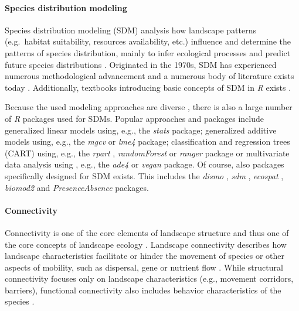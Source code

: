 \documentclass[smallextended]{svjour3}       %
\begin{document}
\hypertarget{sec:SDM}{%
\paragraph{Species distribution modeling}\label{sec:SDM}}

Species distribution modeling (SDM) analysis how landscape patterns (e.g.~habitat suitability, resources availability, etc.) influence and determine the patterns of species distribution, mainly to infer ecological processes and predict future species distributions \cite{Wiersma2011}.
Originated in the 1970s, SDM has experienced numerous methodological advancement and a numerous body of literature exists today \cite{Zimmermann2010}.
Additionally, textbooks introducing basic concepts of SDM in \emph{R} exists \cite{Guisan2017,Fletcher2019}.

Because the used modeling approaches are diverse \cite{Hooten2011,Kerr2011,Fletcher2019}, there is also a large number of \emph{R} packages used for SDMs.
Popular approaches and packages include generalized linear models using, e.g., the \emph{stats} \cite{RCoreTeam2019} package; generalized additive models using, e.g., the \emph{mgcv} \cite{Wood2017} or \emph{lme4} \cite{Bates2015} package; classification and regression trees (CART) using, e.g., the \emph{rpart} \cite{Therneau2019}, \emph{randomForest} \cite{Liaw2002} or \emph{ranger} \cite{Wright2017} package or multivariate data analysis using , e.g., the \emph{ade4} \cite{Dray2007} or \emph{vegan} \cite{Oksanen2019} package.
Of course, also packages specifically designed for SDM exists.
This includes the \emph{dismo} \cite{Hijmans2017}, \emph{sdm} \cite{Naimi2016}, \emph{ecospat} \cite{Broennimann2020}, \emph{biomod2} \cite{Thuiller2020} and \emph{PresenceAbsence} \cite{Freeman2008} packages.

\hypertarget{sec:connectivity}{%
\paragraph{Connectivity}\label{sec:connectivity}}

Connectivity is one of the core elements of landscape structure \cite{Taylor1993} and thus one of the core concepts of landscape ecology \cite{With2019}.
Landscape connectivity describes how landscape characteristics facilitate or hinder the movement of species \cite{Tischendorf2000} or other aspects of mobility, such as dispersal, gene or nutrient flow \cite{With2019}.
While structural connectivity focuses only on landscape characteristics (e.g., movement corridors, barriers), functional connectivity also includes behavior characteristics of the species \cite{Tischendorf2000,With2019}.
\end{document}
